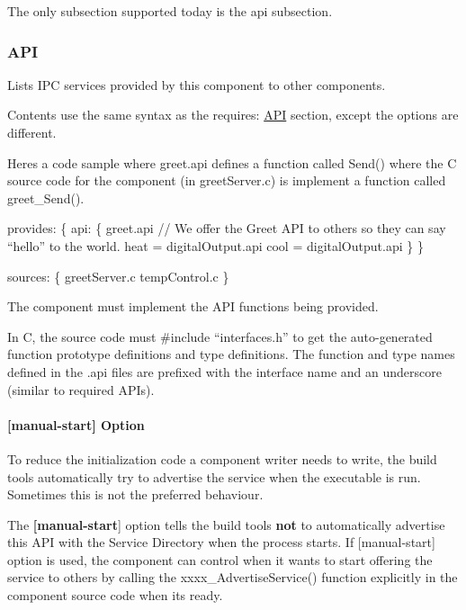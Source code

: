 The only subsection supported today is the {\ttfamily api} subsection.\hypertarget{def_files_cdef_defFilesCdef_providesApi}{}\subsubsection{A\+P\+I}\label{def_files_cdef_defFilesCdef_providesApi}
Lists I\+P\+C services provided by this component to other components.

Contents use the same syntax as the {\ttfamily requires\+:} \hyperlink{def_files_cdef_defFilesCdef_requiresApi}{A\+P\+I} section, except the options are different.

Here\textquotesingle{}s a code sample where {\ttfamily  greet.\+api } defines a function called {\ttfamily Send()} where the C source code for the component (in {\ttfamily greet\+Server.\+c}) is implement a function called {\ttfamily greet\+\_\+\+Send()}.


\begin{DoxyCode}
provides:
\{
    api:
    \{
        greet.api   \textcolor{comment}{// We offer the Greet API to others so they can say “hello” to the world.}
        heat = digitalOutput.api
        cool = digitalOutput.api
    \}
\}

sources:
\{
    greetServer.c
    tempControl.c
\}
\end{DoxyCode}


The component must implement the A\+P\+I functions being provided.

In C, the source code must {\ttfamily \#include “interfaces.\+h”} to get the auto-\/generated function prototype definitions and type definitions. The function and type names defined in the {\ttfamily }.api files are prefixed with the interface name and an underscore (similar to required A\+P\+Is).\hypertarget{def_files_cdef_defFilesCdef_providesApiManualStart}{}\paragraph{\mbox{[}manual-\/start\mbox{]} Option}\label{def_files_cdef_defFilesCdef_providesApiManualStart}
To reduce the initialization code a component writer needs to write, the build tools automatically try to advertise the service when the executable is run. Sometimes this is not the preferred behaviour.

The {\bfseries {\ttfamily }\mbox{[}manual-\/start}\mbox{]} option tells the build tools {\bfseries not} to automatically advertise this A\+P\+I with the Service Directory when the process starts. If {\ttfamily }\mbox{[}manual-\/start\mbox{]} option is used, the component can control when it wants to start offering the service to others by calling the {\ttfamily xxxx\+\_\+\+Advertise\+Service()} function explicitly in the component source code when it\textquotesingle{}s ready.


